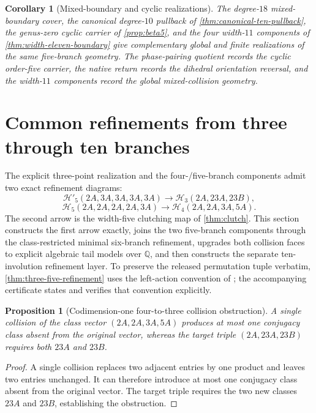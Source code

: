 \documentclass[11pt]{article}
\newtheorem{proposition}[theorem]{Proposition}
\newtheorem{corollary}[theorem]{Corollary}
\theoremstyle{remark}
\newcommand{\Q}{\mathbb Q}
\begin{document}
\begin{corollary}[Mixed-boundary and cyclic realizations]\label{cor:beta5-carriers}
The degree-$18$ mixed-boundary cover, the canonical degree-$10$ pullback of \cref{thm:canonical-ten-pullback}, the genus-zero cyclic carrier of \cref{prop:beta5}, and the four width-$11$ components of \cref{thm:width-eleven-boundary} give complementary global and finite realizations of the same five-branch geometry.  The phase-pairing quotient records the cyclic order-five carrier, the native return records the dihedral orientation reversal, and the width-$11$ components record the global mixed-collision geometry.
\end{corollary}

\section{Common refinements from three through ten branches}\label{sec:mobility}

The explicit three-point realization and the four-/five-branch components admit two exact refinement diagrams:
\[
 \mathcal H'_{5}(2A,3A,3A,3A,3A)
 \longrightarrow
 \mathcal H_{3}(2A,23A,23B),
\]
\[
 \mathcal H_{5}(2A,2A,2A,2A,3A)
 \longrightarrow
 \mathcal H_{4}(2A,2A,3A,5A).
\]
The second arrow is the width-five clutching map of \cref{thm:clutch}.  This section constructs the first arrow exactly, joins the two five-branch components through the class-restricted minimal six-branch refinement, upgrades both collision faces to explicit algebraic tail models over $\Q$, and then constructs the separate ten-involution refinement layer.  To preserve the released permutation tuple verbatim, \cref{thm:three-five-refinement} uses the left-action convention of \cite{HuangEtAl}; the accompanying certificate states and verifies that convention explicitly.

\begin{proposition}[Codimension-one four-to-three collision obstruction]\label{prop:collision-obstruction}
A single collision of the class vector $(2A,2A,3A,5A)$ produces at most one conjugacy class absent from the original vector, whereas the target triple $(2A,23A,23B)$ requires both $23A$ and $23B$.
\end{proposition}

\begin{proof}
A single collision replaces two adjacent entries by one product and leaves two entries unchanged.  It can therefore introduce at most one conjugacy class absent from the original vector.  The target triple requires the two new classes $23A$ and $23B$, establishing the obstruction.
\end{proof}
\end{document}
